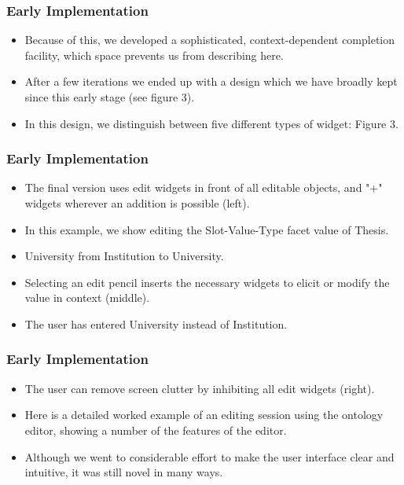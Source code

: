 \documentclass{beamer}
\begin{document}
\begin{frame}
\frametitle{Early Implementation}

\begin{itemize}
\item Because of this, we developed a sophisticated, context-dependent completion facility, which space prevents us from describing here.
\item After a few iterations we ended up with a design which we have broadly kept since this early stage (see figure 3).
\item In this design, we distinguish between five different types of widget: Figure 3.
\end{itemize}

\end{frame}

\begin{frame}
\frametitle{Early Implementation}

\begin{itemize}
\item The final version uses edit widgets in front of all editable objects, and "+" widgets wherever an addition is possible (left).
\item In this example, we show editing the Slot-Value-Type facet value of Thesis.
\item University from Institution to University.
\item Selecting an edit pencil inserts the necessary widgets to elicit or modify the value in context (middle).
\item The user has entered University instead of Institution.
\end{itemize}

\end{frame}

\begin{frame}
\frametitle{Early Implementation}

\begin{itemize}
\item The user can remove screen clutter by inhibiting all edit widgets (right).
\item Here is a detailed worked example of an editing session using the ontology editor, showing a number of the features of the editor.
\item Although we went to considerable effort to make the user interface clear and intuitive, it was still novel in many ways.
\end{itemize}

\end{frame}
\end{document}
